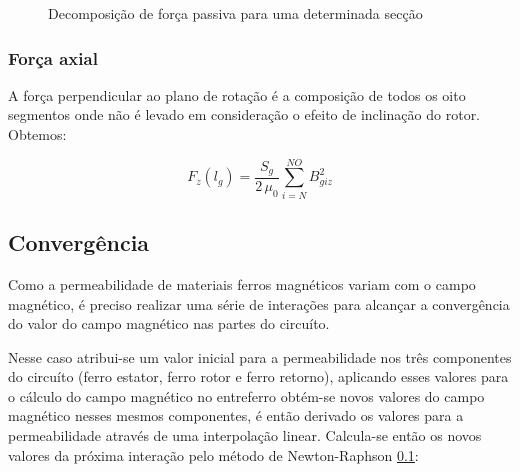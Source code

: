  	\begin{figure}[!ht]
 		\centering
			
 			\caption{Decomposição de força passiva para uma determinada secção}
 			\label{fig:Passivo:decomposicao}
 	\end{figure}



%
%

\subsubsection{Força axial}

A força perpendicular ao plano de rotação é a composição de todos os oito segmentos onde não é levado em consideração o efeito de inclinação do rotor. Obtemos:

\begin{equation}
	  		F_z(l_g) = \frac{S_{g}}{2 \, \mu_0} 	\sum_{i=N}^{NO} B_{giz}^2
\end{equation}


\subsection{Convergência}

Como a permeabilidade de materiais ferros magnéticos variam com o campo magnético, é preciso realizar uma série de interações para alcançar a convergência do valor do campo magnético nas partes do circuíto. 

Nesse caso atribui-se um valor inicial para a permeabilidade nos três componentes do circuíto (ferro estator, ferro rotor e ferro retorno), aplicando esses valores para o cálculo do campo magnético no entreferro obtém-se novos valores do campo magnético nesses mesmos componentes, é então derivado os valores para a permeabilidade através de uma interpolação linear. Calcula-se então os novos valores da próxima interação pelo método de Newton-Raphson \ref{}: 
	
